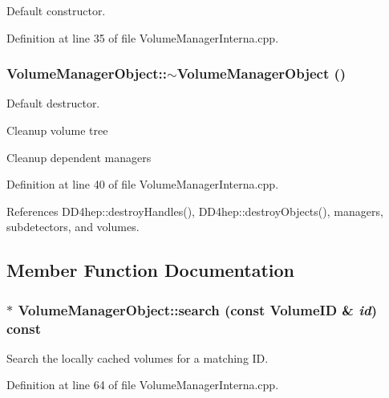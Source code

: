 Default constructor. 

Definition at line 35 of file VolumeManagerInterna.cpp.\hypertarget{class_d_d4hep_1_1_geometry_1_1_volume_manager_object_a9c8a75f018315e09a2d5180cacd45468}{
\subsubsection[{$\sim$VolumeManagerObject}]{\setlength{\rightskip}{0pt plus 5cm}VolumeManagerObject::$\sim$VolumeManagerObject ()}}
\label{class_d_d4hep_1_1_geometry_1_1_volume_manager_object_a9c8a75f018315e09a2d5180cacd45468}


Default destructor. 

Cleanup volume tree

Cleanup dependent managers 

Definition at line 40 of file VolumeManagerInterna.cpp.

References DD4hep::destroyHandles(), DD4hep::destroyObjects(), managers, subdetectors, and volumes.

\subsection{Member Function Documentation}
\hypertarget{class_d_d4hep_1_1_geometry_1_1_volume_manager_object_a4ce40901516b6f1e4bb0db611f46eacd}{
\subsubsection[{search}]{ $\ast$ VolumeManagerObject::search (const VolumeID \& {\em id}) const}}
\label{class_d_d4hep_1_1_geometry_1_1_volume_manager_object_a4ce40901516b6f1e4bb0db611f46eacd}


Search the locally cached volumes for a matching ID. 

Definition at line 64 of file VolumeManagerInterna.cpp.


